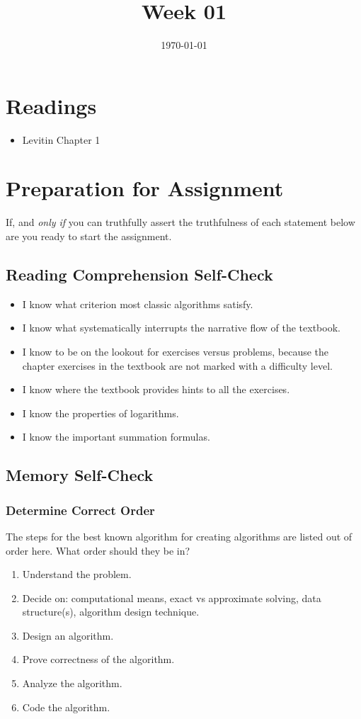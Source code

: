 \documentclass[12pt]{amsart}
\title{Week 01}
\date{\today}
\begin{document}
\maketitle
\section{Readings}
\begin{itemize}
	\item Levitin Chapter 1
\end{itemize}
\section{Preparation for Assignment}
If, and \textit{only if} you can truthfully assert the truthfulness of each statement below are you ready to start the assignment.
\subsection {Reading Comprehension Self-Check}
\begin{itemize}
	\item I know what criterion most classic algorithms satisfy.
	\item I know what systematically interrupts the narrative flow of the textbook.
	\item I know to be on the lookout for exercises versus problems, because the chapter exercises in the textbook are not marked with a difficulty level.
	\item I know where the textbook provides hints to all the exercises.
	\item I know the properties of logarithms.
	\item I know the important summation formulas.
\end{itemize}
\subsection{Memory Self-Check}
\subsubsection{Determine Correct Order}

The steps for the best known algorithm for creating algorithms are listed out of order here. What order should they be in?
\begin{enumerate}
	\item Understand the problem.
	\item Decide on: computational means, exact vs approximate solving, data structure(s), algorithm
 design technique.
 	\item Design an algorithm.
	\item Prove correctness of the algorithm.
	\item Analyze the algorithm.
	\item Code the algorithm.
\end{enumerate}
\end{document}
